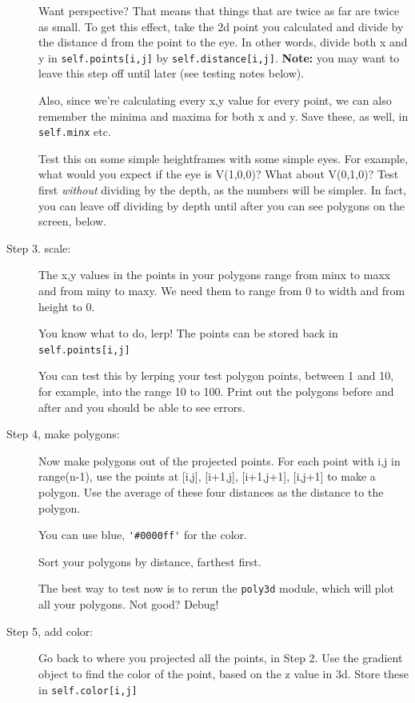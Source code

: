 \documentclass[12pt]{article}
\begin{document}
\begin{description}
Want perspective?  That means that things that
are twice as far are twice as small.  To get this effect,
take the 2d point you calculated and divide by
the distance d from the point to the eye.  In other
words, divide both x and y in \lstinline{self.points[i,j]}
by \lstinline{self.distance[i,j]}.  {\bf Note:}
you may want to leave this step off until later (see testing
notes below).

Also, since we're calculating every x,y value for every point,
we can also remember the minima and maxima for both
x and y.  Save these, as well, in \lstinline{self.minx} etc.

Test this on some simple heightframes with some simple
eyes.  For example, what would you expect if the eye 
is V(1,0,0)?  What about V(0,1,0)?  
Test first {\em without} dividing by the depth,
as the numbers will be simpler.  In fact, you
can leave off dividing by depth until after 
you can see polygons on the screen, below.

\item[Step 3. scale:] The x,y values in the points
in your polygons
range from minx to maxx and from miny to maxy.  We need
them to range from 0 to width and from height to 0.

You know what to do, lerp!  The points can be stored
back in \lstinline{self.points[i,j]}

You can test this by lerping your test polygon
points, between 1 and 10, for example, into the
range 10 to 100.  Print out the polygons before 
and after and you should be able to see errors.

\item[Step 4, make polygons:]
Now make polygons out of the projected points.
For each point with i,j in range(n-1), use the points
at [i,j], [i+1,j], [i+1,j+1], [i,j+1] to make a polygon.
Use the average of these four distances as the
distance to the polygon.  

You can use blue, \lstinline{'#0000ff'}
for the color.

Sort your polygons by distance, farthest first.

The best way to test now is to rerun the \lstinline{poly3d}
module, which will plot all your polygons.  Not good?  Debug!

\item[Step 5, add color:] Go back to where you projected all the
points, in Step  2.  Use the gradient object to find the color
of the point, based on the z value in 3d.  Store these in
\lstinline{self.color[i,j]}  


\end{description}
\end{document}
